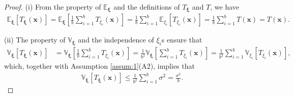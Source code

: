 \documentclass[10pt,a4paper]{amsart}
\begin{document}
\begin{proof}
(i) From the property of $\mathbb{E}_{\bm{\xi}}$ and the definitions of $T_{\bm{\xi}}$ and $T$, we have 
\begin{align*}
\mathbb{E}_{\bm{\xi}}[T_{\bm{\xi}}(\bm{x})]
= 
\mathbb{E}_{\bm{\xi}} \left[
\frac{1}{b} \sum_{i=1}^b T_{\xi_{i}}(\bm{x})
\right]
= 
\frac{1}{b} \sum_{i=1}^b \mathbb{E}_{\xi_i} [T_{\xi_{i}}(\bm{x})]
= \frac{1}{b} \sum_{i=1}^b T (\bm{x})
= T (\bm{x}).
\end{align*}

(ii) The property of $\mathbb{V}_{\bm{\xi}}$ and the independence of $\xi_i$s ensure that
\begin{align*}
\mathbb{V}_{\bm{\xi}}[T_{\bm{\xi}} (\bm{x})]
&= 
\mathbb{V}_{\bm{\xi}} \left[
\frac{1}{b} \sum_{i=1}^b T_{\xi_{i}}(\bm{x}) 
\right]
= 
\frac{1}{b^{2}}
\mathbb{V}_{\bm{\xi}} \left[
\sum_{i=1}^b T_{\xi_{i}}(\bm{x})
\right]
= 
\frac{1}{b^{2}}
\sum_{i=1}^b
\mathbb{V}_{\xi_i} \left[
T_{\xi_{i}}(\bm{x})
\right],
\end{align*}
which, together with Assumption \ref{assum:1}(A2), implies that
\begin{align*}
\mathbb{V}_{\bm{\xi}}[T_{\bm{\xi}} (\bm{x})]
\leq 
\frac{1}{b^{2}}
\sum_{i=1}^b \sigma^2
= \frac{\sigma^2}{b}.
\end{align*}


\end{proof}
\end{document}
